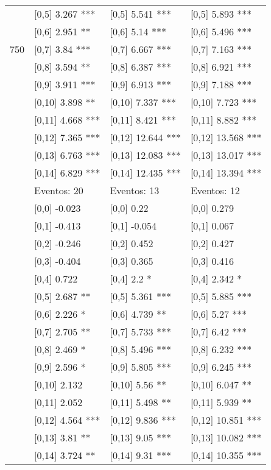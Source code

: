 \begin{table}
\begin{tabular}[t]{llll}
 & {}[0,5] 3.267 *** & {}[0,5] 5.541 *** & {}[0,5] 5.893 ***\\
 & {}[0,6] 2.951 ** & {}[0,6] 5.14 *** & {}[0,6] 5.496 ***\\
750 & {}[0,7] 3.84 *** & {}[0,7] 6.667 *** & {}[0,7] 7.163 ***\\
\addlinespace
 & {}[0,8] 3.594 ** & {}[0,8] 6.387 *** & {}[0,8] 6.921 ***\\
 & {}[0,9] 3.911 *** & {}[0,9] 6.913 *** & {}[0,9] 7.188 ***\\
 & {}[0,10] 3.898 ** & {}[0,10] 7.337 *** & {}[0,10] 7.723 ***\\
 & {}[0,11] 4.668 *** & {}[0,11] 8.421 *** & {}[0,11] 8.882 ***\\
 & {}[0,12] 7.365 *** & {}[0,12] 12.644 *** & {}[0,12] 13.568 ***\\
\addlinespace
 & {}[0,13] 6.763 *** & {}[0,13] 12.083 *** & {}[0,13] 13.017 ***\\
 & {}[0,14] 6.829 *** & {}[0,14] 12.435 *** & {}[0,14] 13.394 ***\\
 & Eventos:  20 & Eventos:  13 & Eventos:  12\\
 & {}[0,0] -0.023 & {}[0,0] 0.22 & {}[0,0] 0.279\\
 & {}[0,1] -0.413 & {}[0,1] -0.054 & {}[0,1] 0.067\\
\addlinespace
 & {}[0,2] -0.246 & {}[0,2] 0.452 & {}[0,2] 0.427\\
 & {}[0,3] -0.404 & {}[0,3] 0.365 & {}[0,3] 0.416\\
 & {}[0,4] 0.722 & {}[0,4] 2.2 * & {}[0,4] 2.342 *\\
 & {}[0,5] 2.687 ** & {}[0,5] 5.361 *** & {}[0,5] 5.885 ***\\
 & {}[0,6] 2.226 * & {}[0,6] 4.739 ** & {}[0,6] 5.27 ***\\
\addlinespace
1000 & {}[0,7] 2.705 ** & {}[0,7] 5.733 *** & {}[0,7] 6.42 ***\\
 & {}[0,8] 2.469 * & {}[0,8] 5.496 *** & {}[0,8] 6.232 ***\\
 & {}[0,9] 2.596 * & {}[0,9] 5.805 *** & {}[0,9] 6.245 ***\\
 & {}[0,10] 2.132 & {}[0,10] 5.56 ** & {}[0,10] 6.047 **\\
 & {}[0,11] 2.052 & {}[0,11] 5.498 ** & {}[0,11] 5.939 **\\
\addlinespace
 & {}[0,12] 4.564 *** & {}[0,12] 9.836 *** & {}[0,12] 10.851 ***\\
 & {}[0,13] 3.81 ** & {}[0,13] 9.05 *** & {}[0,13] 10.082 ***\\
 & {}[0,14] 3.724 ** & {}[0,14] 9.31 *** & {}[0,14] 10.355 ***\\
\bottomrule
\end{tabular}
\end{table}
